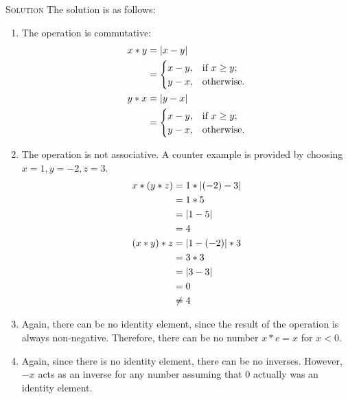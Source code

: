 \documentclass[draft,twoside]{amsart}
\newcommand{\Solution}{\textsc{Solution}\xspace}
\begin{document}
\begin{enumerate}
   \noindent \Solution The solution is as follows:
   \begin{enumerate}

      \item The operation is commutative:
      \begin{align*}
         x * y & = | x - y |           \\
	       & =
	       \begin{cases}
	          x - y,     & \text{if $x \ge y$;} \\
		  y - x,     & \text{otherwise.}
	       \end{cases} \notag \\
	 y * x & = | y - x |           \\
	       & =
	       \begin{cases}
	          x - y,     & \text{if $x \ge y$;} \\
		  y - x,     & \text{otherwise.}
	       \end{cases} \notag 
      \end{align*}

      \item The operation is not associative. A counter example is provided
      by choosing $x = 1, y = -2, z = 3$.
      \begin{align*}
         x * (y * z) & = 1 * |(-2) - 3|    \\
	             & = 1 * 5       \notag \\
		     & = | 1 - 5 |   \notag \\
		     & = 4           \notag \\
	 (x * y) * z & = | 1 - (-2) | * 3  \\
	             & = 3 * 3       \notag \\
		     & = | 3 - 3 |   \notag \\
		     & = 0           \notag \\
		     & \ne 4         \notag
      \end{align*}

      \item Again, there can be no identity element, since the result of
      the operation is always non-negative. Therefore, there can be 
      no number $x * e = x$ for $x < 0$.

      \item Again, since there is no identity element, there can be no inverses.
      However, $-x$ acts as an inverse for any number assuming that $0$ actually
      was an identity element.
   \end{enumerate}


\end{enumerate}
\end{document}
